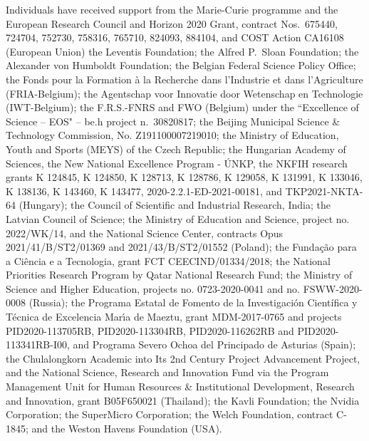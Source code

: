 \documentclass[11pt,twoside,a4paper]{cms-tdr}
\begin{document}
\begin{itemize}
 Individuals have received support from the Marie-Curie programme and the European Research Council and Horizon 2020 Grant, contract Nos.\ 675440, 724704, 752730, 758316, 765710, 824093, 884104, and COST Action CA16108 (European Union) the Leventis Foundation; the Alfred P.\ Sloan Foundation; the Alexander von Humboldt Foundation; the Belgian Federal Science Policy Office; the Fonds pour la Formation \`a la Recherche dans l'Industrie et dans l'Agriculture (FRIA-Belgium); the Agentschap voor Innovatie door Wetenschap en Technologie (IWT-Belgium); the F.R.S.-FNRS and FWO (Belgium) under the ``Excellence of Science -- EOS" -- be.h project n.\ 30820817; the Beijing Municipal Science \& Technology Commission, No. Z191100007219010; the Ministry of Education, Youth and Sports (MEYS) of the Czech Republic; the Hungarian Academy of Sciences, the New National Excellence Program - \'UNKP, the NKFIH research grants K 124845, K 124850, K 128713, K 128786, K 129058, K 131991, K 133046, K 138136, K 143460, K 143477, 2020-2.2.1-ED-2021-00181, and TKP2021-NKTA-64 (Hungary); the Council of Scientific and Industrial Research, India; the Latvian Council of Science; the Ministry of Education and Science, project no. 2022/WK/14, and the National Science Center, contracts Opus 2021/41/B/ST2/01369 and 2021/43/B/ST2/01552 (Poland); the Funda\c{c}\~ao para a Ci\^encia e a Tecnologia, grant FCT CEECIND/01334/2018; the National Priorities Research Program by Qatar National Research Fund; the Ministry of Science and Higher Education, projects no. 0723-2020-0041 and no. FSWW-2020-0008 (Russia); the Programa Estatal de Fomento de la Investigaci{\'o}n Cient{\'i}fica y T{\'e}cnica de Excelencia Mar\'{\i}a de Maeztu, grant MDM-2017-0765 and projects PID2020-113705RB, PID2020-113304RB, PID2020-116262RB and PID2020-113341RB-I00, and Programa Severo Ochoa del Principado de Asturias (Spain); the Chulalongkorn Academic into Its 2nd Century Project Advancement Project, and the National Science, Research and Innovation Fund via the Program Management Unit for Human Resources \& Institutional Development, Research and Innovation, grant B05F650021 (Thailand); the Kavli Foundation; the Nvidia Corporation; the SuperMicro Corporation; the Welch Foundation, contract C-1845; and the Weston Havens Foundation (USA).
\end{itemize}
\end{document}
